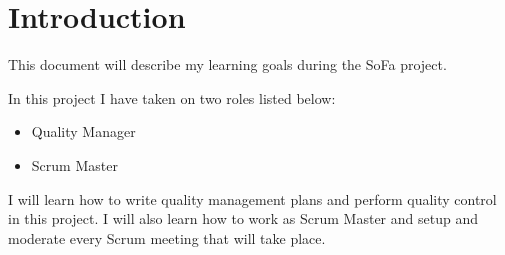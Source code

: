 \section{Introduction}
This document will describe my learning goals during the SoFa project.

In this project I have taken on two roles listed below:
\begin{itemize}
	\item Quality Manager
	\item Scrum Master
\end{itemize}

I will learn how to write quality management plans and perform quality control in this project. I will also learn how to work as Scrum Master and setup and moderate every Scrum meeting that will take place.

